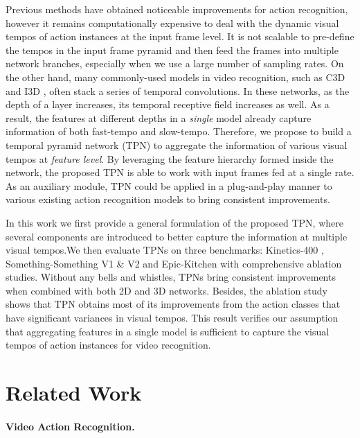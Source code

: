 \documentclass[10pt,twocolumn,letterpaper]{article}
\begin{document}
Previous methods \cite{slowfast, dtpn, spn} have obtained noticeable improvements for action recognition, however it remains computationally expensive to deal with the dynamic visual tempos of action instances at the input frame level. 
It is not scalable to pre-define the tempos in the input frame pyramid and then feed the frames into multiple network branches, especially when we use a large number of sampling rates.
On the other hand, many commonly-used models in video recognition, such as C3D and I3D \cite{c3d,kinetics}, often stack a series of temporal convolutions. In these networks, as the depth of a layer increases, its temporal receptive field increases as well.
As a result, the features at different depths in a \emph{single} model already capture information of both fast-tempo and slow-tempo.
Therefore, we propose to build a temporal pyramid network (TPN) to aggregate the information of various visual tempos at \textit{feature level}.
By leveraging the feature hierarchy formed inside the network, the proposed TPN is able to work with input frames fed at a single rate. 
As an auxiliary module, TPN could be applied in a plug-and-play manner to various existing action recognition models to bring consistent improvements.

In this work we first provide a general formulation of the proposed TPN, where several components are introduced to better capture the information at multiple visual tempos.We then evaluate TPNs on three benchmarks: Kinetics-400 \cite{kinetics}, Something-Something V1 \& V2 \cite{sthv1} and Epic-Kitchen \cite{epic} with comprehensive ablation studies.
Without any bells and whistles, TPNs bring consistent improvements when combined with both 2D and 3D networks.
Besides, the ablation study shows that TPN obtains most of its improvements from the action classes that have significant variances in visual tempos.
This result verifies our assumption that aggregating features in a single model is sufficient to capture the visual tempos of action instances for video recognition.

 \section{Related Work}
\label{sec:relat}

\paragraph{Video Action Recognition.}
\end{document}
